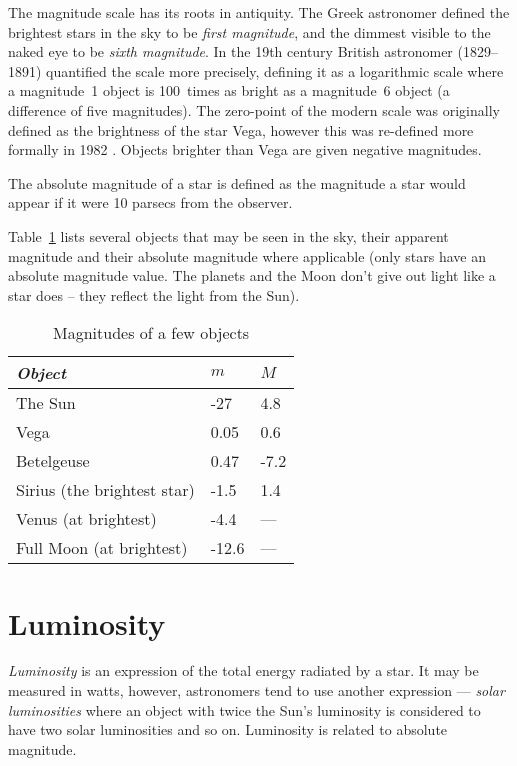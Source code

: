The magnitude scale has its roots in antiquity. The Greek astronomer
 defined the brightest stars in the sky to be \emph{first
magnitude}, and the dimmest visible to the naked eye to be \emph{sixth
magnitude}. In the 19th century British astronomer  (1829--1891)
quantified the scale more precisely, defining it as a logarithmic scale
where a magnitude~1 object is 100~times as bright as a magnitude~6
object (a difference of five magnitudes). The zero-point of the modern
scale was originally defined as the brightness of the star Vega, however
this was re-defined more formally in 1982 \citep{landolt}. Objects brighter
than Vega are given negative magnitudes.

The absolute magnitude of a star is defined as the magnitude a star
would appear if it were 10 parsecs from the observer.

Table~\ref{tab:Concepts:Magnitudes} lists several objects that may be seen
in the sky, their apparent magnitude and their absolute magnitude where
applicable (only stars have an absolute magnitude value. The planets and
the Moon don't give out light like a star does -- they reflect the light
from the Sun).

\begin{table}[htb]
  \centering
  \begin{tabular}{lll}
\toprule
\emph{Object} & $m$ & $M$\\\midrule
The Sun & -27 & 4.8\\
Vega & 0.05 & 0.6\\
Betelgeuse & 0.47 & -7.2\\
Sirius (the brightest star) & -1.5 & 1.4\\
Venus (at brightest) & -4.4 & ---\\
Full Moon (at brightest) & -12.6 & ---\\
\bottomrule
\end{tabular}
  \caption{Magnitudes of a few objects}
  \label{tab:Concepts:Magnitudes}
\end{table}


\section{Luminosity}
\label{sec:Concepts:Luminosity}

\emph{Luminosity} is an expression of the total energy radiated by a
star. It may be measured in watts, however, astronomers tend to use
another expression --- \emph{solar luminosities} where an object with
twice the Sun's luminosity is considered to have two solar luminosities
and so on. Luminosity is related to absolute magnitude.


